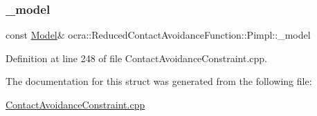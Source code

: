 \hypertarget{structReducedContactAvoidanceFunction_1_1Pimpl_acd2bf5f47839d39cb37ac323e038558f}{}\label{structReducedContactAvoidanceFunction_1_1Pimpl_acd2bf5f47839d39cb37ac323e038558f} 
\subsubsection{\texorpdfstring{\+\_\+model}{\_model}}
{\footnotesize\ttfamily const \hyperlink{classocra_1_1Model}{Model}\& ocra\+::\+Reduced\+Contact\+Avoidance\+Function\+::\+Pimpl\+::\+\_\+model}



Definition at line 248 of file Contact\+Avoidance\+Constraint.\+cpp.



The documentation for this struct was generated from the following file\+:\begin{DoxyCompactItemize}
\item 
\hyperlink{ContactAvoidanceConstraint_8cpp}{Contact\+Avoidance\+Constraint.\+cpp}\end{DoxyCompactItemize}
